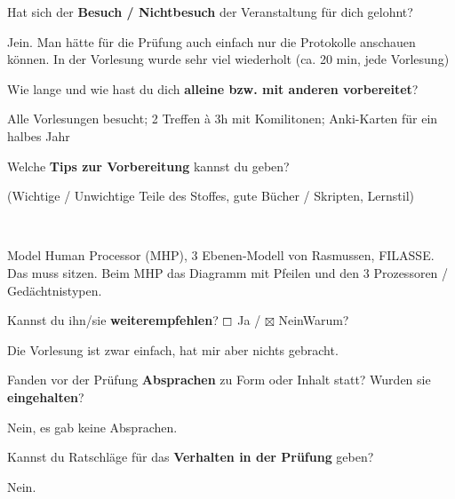\documentclass[a4paper]{article}
\begin{document}
 \begin{multicols}{2}

   Hat sich der \textbf{Besuch / Nichtbesuch} der Veranstaltung für dich gelohnt? \\
  \begin{minipage}[t][6.8cm]{\linewidth}
    Jein. Man hätte für die Prüfung auch einfach nur die Protokolle anschauen
    können. In der Vorlesung wurde sehr viel wiederholt (ca. 20 min, jede
    Vorlesung)

  \end{minipage}

   Wie lange und wie hast du dich \textbf{alleine bzw. mit anderen vorbereitet}? \\
  \begin{minipage}[t][7cm]{\linewidth}
    Alle Vorlesungen besucht; 2 Treffen à 3h mit Komilitonen; Anki-Karten für
    ein halbes Jahr
  \end{minipage}

   Welche \textbf{Tips zur Vorbereitung} kannst du geben?
  \begin{footnotesize}(Wichtige / Unwichtige Teile des Stoffes, gute Bücher / Skripten, Lernstil)\end{footnotesize} \\
  \begin{minipage}[t][7cm]{\linewidth}
    Model Human Processor (MHP), 3 Ebenen-Modell von Rasmussen, FILASSE. Das
    muss sitzen. Beim MHP das Diagramm mit Pfeilen und den 3 Prozessoren /
    Gedächtnistypen.
  \end{minipage}

\columnbreak

   Kannst du ihn/sie \textbf{weiterempfehlen}?
  $\boxempty$ Ja / $\boxtimes$ Nein\newline Warum? \\
  \begin{minipage}[t][6.8cm]{\linewidth}
    Die Vorlesung ist zwar einfach, hat mir aber nichts gebracht.

  \end{minipage}

   Fanden vor der Prüfung \textbf{Absprachen} zu Form oder Inhalt statt? Wurden sie \textbf{eingehalten}? \\
  \begin{minipage}[t][7cm]{\linewidth}
    Nein, es gab keine Absprachen.

  \end{minipage}

   Kannst du Ratschläge für das \textbf{Verhalten in der Prüfung} geben? \\
  \begin{minipage}[t][6.8cm]{\linewidth}
    Nein.
  \end{minipage}
%
\end{multicols}
\clearpage
\end{document}
